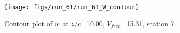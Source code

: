 \begin{figure}[H]
\centering
\texttt{[image: figs/run\_61/run\_61\_W\_contour]}
\caption{Contour plot of $\overline{w}$ at $z/c$=10.00, $V_{free}$=15.31, station 7.}
\label{fig:run_61_W_contour}
\end{figure}


